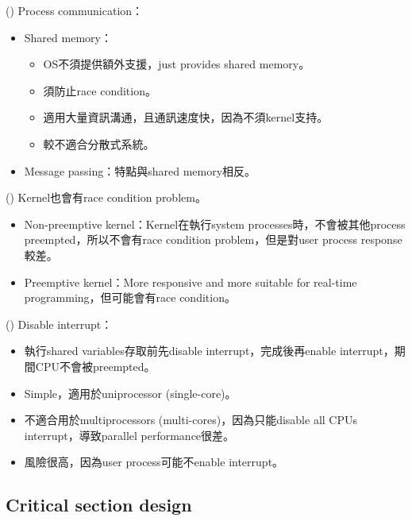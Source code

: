 \begin{theorem}{()} Process communication：\begin{itemize}
        \item Shared memory：\begin{itemize}
            \item OS不須提供額外支援，just provides shared memory。
            \item 須防止race condition。
            \item 適用大量資訊溝通，且通訊速度快，因為不須kernel支持。
            \item 較不適合分散式系統。
        \end{itemize}
        \item Message passing：特點與shared memory相反。
    \end{itemize}
\end{theorem}

\begin{theorem}{()} Kernel也會有race condition problem。\begin{itemize}
        \item Non-preemptive kernel：Kernel在執行system processes時，不會被其他process preempted，所以不會有race condition problem，但是對user process response較差。
        \item Preemptive kernel：More responsive and more suitable for real-time programming，但可能會有race condition。
    \end{itemize}
\end{theorem}

\begin{theorem}{()} Disable interrupt：\begin{itemize}
        \item 執行shared variables存取前先disable interrupt，完成後再enable interrupt，期間CPU不會被preempted。
        \item Simple，適用於uniprocessor (single-core)。
        \item 不適合用於multiprocessors (multi-cores)，因為只能disable all CPUs interrupt，導致parallel performance很差。
        \item 風險很高，因為user process可能不enable interrupt。
    \end{itemize}
\end{theorem}

\subsection{Critical section design}

